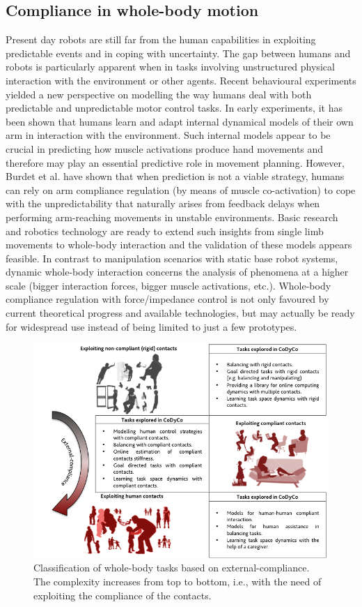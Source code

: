 \documentclass[final,5p,twocolumn]{elsarticle}
\begin{document}
\subsection {Compliance in whole-body motion}

Present day robots are still far from the human capabilities in exploiting predictable events and in coping with uncertainty. The gap between humans and robots is particularly apparent when in tasks involving unstructured physical interaction with the environment or other agents. Recent behavioural experiments yielded a new perspective on modelling the way humans deal with both predictable and unpredictable motor control tasks. In early experiments, it has been shown \cite{Shadmehr1994a} that humans learn and adapt internal dynamical models of their own arm in interaction with the environment. Such internal models appear to be crucial in predicting how muscle activations produce hand movements and therefore may play an essential predictive role in movement planning. However, Burdet et al. \cite{Burdet2001} have shown that when prediction is not a viable strategy, humans can rely on arm compliance regulation (by means of muscle co-activation) to cope with the unpredictability that naturally arises from feedback delays when performing arm-reaching movements in unstable environments. Basic research and robotics technology are ready to extend such insights from single limb movements to whole-body interaction and the validation of these models appears feasible. In contrast to manipulation scenarios with static base robot systems, dynamic whole-body interaction concerns the analysis of phenomena at a higher scale (bigger interaction forces, bigger muscle activations, etc.).  Whole-body compliance regulation with force/impedance control is not only favoured by current theoretical progress and available technologies, but may actually be ready for widespread use instead of being limited to just a few prototypes.

\begin{figure}
\centering
\includegraphics[width=\linewidth]{./images/classification1.png}
\caption{Classification of whole-body tasks based on external-compliance. The complexity increases from top to bottom, i.e., with the need of exploiting the compliance of the contacts.}
\label{fig:classification1}
\end{figure}
\end{document}
